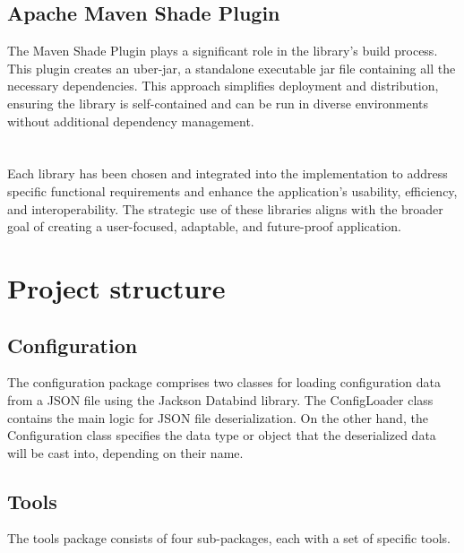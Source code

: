 \documentclass[
  digital,     %
  oneside,     %
  nosansbold,  %
  nocolorbold, %
  lof,         %
  lot,         %
]{fithesis4}
\begin{document}
\subsection{Apache Maven Shade Plugin}
The Maven Shade Plugin plays a significant role in the library's build process. This plugin creates an uber-jar, a standalone executable jar file containing all the necessary dependencies. This approach simplifies deployment and distribution, ensuring the library is self-contained and can be run in diverse environments without additional dependency management.
\section*{}
Each library has been chosen and integrated into the implementation to address specific functional requirements and enhance the application's usability, efficiency, and interoperability. The strategic use of these libraries aligns with the broader goal of creating a user-focused, adaptable, and future-proof application.

\section{Project structure}
\subsection{Configuration}
\vskip 0.35cm

The configuration package comprises two classes for loading configuration data from a JSON file using the Jackson Databind library. The ConfigLoader class contains the main logic for JSON file deserialization. On the other hand, the Configuration class specifies the data type or object that the deserialized data will be cast into, depending on their name.

\subsection{Tools}
\vskip 0.35cm

The tools package consists of four sub-packages, each with a set of specific tools. 
\end{document}

